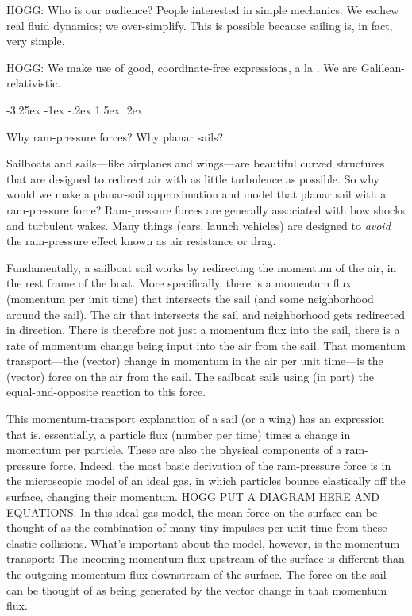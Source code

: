 \documentclass[letterpaper]{article}
\makeatletter
\renewcommand\section{\@startsection {section}{1}{\z@}%
  {-3.25ex \@plus -1ex \@minus -.2ex}%
  {1.5ex \@plus .2ex}%
  {\raggedright\normalfont\large\bfseries}}
\makeatother
\begin{document}
HOGG: Who is our audience? People interested in simple mechanics.
We eschew real fluid dynamics; we over-simplify.
This is possible because sailing is, in fact, very simple.

HOGG: We make use of good, coordinate-free expressions, a la \cite{kusse}.
We are Galilean-relativistic.

\section{Why ram-pressure forces? Why planar sails?}\label{sec:ram}

Sailboats and sails---like airplanes and wings---are beautiful curved structures that are designed to redirect air with as little turbulence as possible.
So why would we make a planar-sail approximation and model that planar sail with a ram-pressure force?
Ram-pressure forces are generally associated with bow shocks and turbulent wakes.
Many things (cars, launch vehicles) are designed to \emph{avoid} the ram-pressure effect known as air resistance or drag.

Fundamentally, a sailboat sail works by redirecting the momentum of the air, in the rest frame of the boat.
More specifically, there is a momentum flux (momentum per unit time) that intersects the sail (and some neighborhood around the sail).
The air that intersects the sail and neighborhood gets redirected in direction.
There is therefore not just a momentum flux into the sail, there is a rate of momentum change being input into the air from the sail.
That momentum transport---the (vector) change in momentum in the air per unit time---is the (vector) force on the air from the sail.
The sailboat sails using (in part) the equal-and-opposite reaction to this force.

This momentum-transport explanation of a sail (or a wing) has an expression that is, essentially, a particle flux (number per time) times a change in momentum per particle.
These are also the physical components of a ram-pressure force.
Indeed, the most basic derivation of the ram-pressure force is in the microscopic model of an ideal gas, in which particles bounce elastically off the surface, changing their momentum.
HOGG PUT A DIAGRAM HERE AND EQUATIONS.
In this ideal-gas model, the mean force on the surface can be thought of as the combination of many tiny impulses per unit time from these elastic collisions.
What's important about the model, however, is the momentum transport:
The incoming momentum flux upstream of the surface is different than the outgoing momentum flux downstream of the surface.
The force on the sail can be thought of as being generated by the vector change in that momentum flux.
\end{document}

